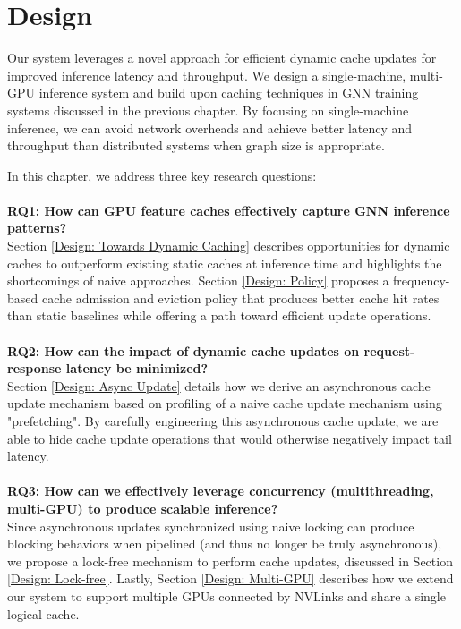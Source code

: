 \chapter{Design} \label{Design}
Our system leverages a novel approach for efficient dynamic cache updates for improved inference latency and throughput.
We design a single-machine, multi-GPU inference system and build upon caching techniques in GNN training systems discussed in the previous chapter. 
By focusing on single-machine inference, we can avoid network overheads and achieve better latency and throughput than distributed systems when graph size is appropriate.

In this chapter, we address three key research questions:
\\ \\
\noindent \textbf{RQ1: How can GPU feature caches effectively capture GNN inference patterns?} \\
Section \ref{Design: Towards Dynamic Caching} describes opportunities for dynamic caches to outperform existing static caches at inference time and highlights the shortcomings of naive approaches. Section \ref{Design: Policy} proposes a frequency-based cache admission and eviction policy that produces better cache hit rates than static baselines while offering a path toward efficient update operations.
\\ \\
\noindent \textbf{RQ2: How can the impact of dynamic cache updates on request-response latency be minimized?} \\
Section \ref{Design: Async Update} details how we derive an asynchronous cache update mechanism based on profiling of a naive cache update mechanism using "prefetching". By carefully engineering this asynchronous cache update, we are able to hide cache update operations that would otherwise negatively impact tail latency.
\\ \\
\noindent \textbf{RQ3: How can we effectively leverage concurrency (multithreading, multi-GPU) to produce scalable inference?} \\
Since asynchronous updates synchronized using naive locking can produce blocking behaviors when pipelined (and thus no longer be truly asynchronous), we propose a lock-free mechanism to perform cache updates, discussed in Section \ref{Design: Lock-free}.
Lastly, Section \ref{Design: Multi-GPU} describes how we extend our system to support multiple GPUs connected by NVLinks and share a single logical cache.

